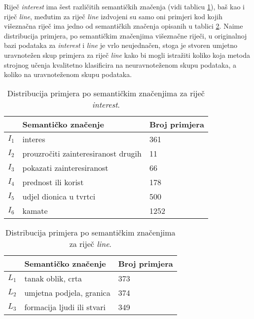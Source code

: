 \documentclass[10pt, a4paper]{article}
\begin{document}
Riječ \emph{interest} ima šest različitih semantičkih značenja (vidi tablicu \ref{tab:interest_distribution}), baš kao i riječ \emph{line},
međutim za riječ \emph{line} izdvojeni su samo oni primjeri kod kojih višeznačna riječ ima
jedno od semantičkih značenja opisanih u tablici \ref{tab:line_distribution}.
Naime distribucija primjera, po semantičkim značenjima višeznačne riječi, u 
originalnoj bazi podataka za \emph{interest} i \emph{line} je vrlo neujednačen,
stoga je stvoren umjetno uravnotežen skup primjera za riječ \emph{line} kako
bi mogli istražiti koliko koja metoda strojnog učenja
kvalitetno klasificira na neuravnoteženom skupu podataka, 
a koliko na uravnoteženom skupu podataka.
\begin{table}[!hbtp]
\caption{Distribucija primjera po semantičkim značenjima za riječ \emph{interest}.}
\label{tab:interest_distribution}
\begin{center}
\begin{tabular}{lll}
\toprule
& Semantičko značenje & Broj primjera \\
\midrule
$I_1$ & interes  	 									& 361\\
$I_2$ & prouzročiti zainteresiranost drugih 			& 11\\
$I_3$ & pokazati zainteresiranost						& 66\\
$I_4$ & prednost ili korist 							& 178\\
$I_5$ & udjel dionica u tvrtci  						& 500\\
$I_6$ & kamate 											& 1252\\
\bottomrule
\end{tabular}
\end{center}
\end{table}
\begin{table}[!hbtp]
\caption{Distribucija primjera po semantičkim značenjima za riječ \emph{line}.}
\label{tab:line_distribution}
\begin{center}
\begin{tabular}{lll}
\toprule
& Semantičko značenje & Broj primjera \\
\midrule
$L_1$ & tanak oblik, crta							& 373\\
$L_2$ & umjetna podjela, granica 					& 374\\
$L_3$ & formacija ljudi ili stvari					& 349\\
\bottomrule
\end{tabular}
\end{center}
\end{table}
\end{document}
